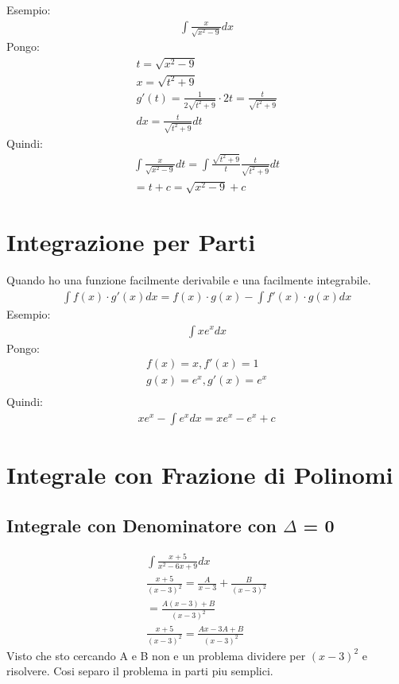\documentclass{article}
\begin{document}
Esempio:
\begin{gather*}
		\int \frac{x}{\sqrt{x^2 - 9}}dx
\end{gather*}
Pongo:
\begin{gather*}
		t=\sqrt{x^2 - 9}\\
		x = \sqrt{t^2 + 9}\\
		g'(t) = \frac{1}{2\sqrt{t^2 + 9}}\cdot 2t =\frac{t}{\sqrt{t^2+9}}\\
		dx=\frac{t}{\sqrt{t^2+9}}dt
\end{gather*}
Quindi:
\begin{gather*}
		\int \frac{x}{\sqrt{x^2-9}}dt=\int \frac{\sqrt{t^2+9}}{t}\frac{t}{\sqrt{t^2+9}}dt\\
		= t +c =\sqrt{x^2-9}+c
\end{gather*}
\section{Integrazione per Parti}
Quando ho una funzione facilmente derivabile e una facilmente integrabile.
\begin{gather*}
		\int f(x)\cdot g'(x)dx = f(x)\cdot g(x) - \int f'(x)\cdot g(x)dx
\end{gather*}
Esempio:
\begin{gather*}
		\int xe^x dx		
\end{gather*}
Pongo:
\begin{gather*}
		f(x) = x, f'(x) = 1\\
		g(x) = e^x, g'(x) = e^x\\
\end{gather*}
Quindi:
\begin{gather*}
		xe^x - \int e^x dx = xe^x - e^x + c
\end{gather*}
\section{Integrale con Frazione di Polinomi}

\subsection{Integrale con Denominatore con $\Delta$ = 0}

\begin{gather*}
		\int \frac{x + 5}{x^2-6x+9}dx\\
		\frac{x+5}{(x-3)^2} = \frac{A}{x-3}+\frac{B}{(x-3)^2}\\
	=\frac{A(x-3)+B}{(x-3)^2}\\
	\frac{x+5}{(x-3)^2}=\frac{Ax-3A+B}{(x-3)^2}
\end{gather*}
Visto che sto cercando A e B non e un problema dividere per  $(x-3)^2$ e risolvere. Cosi separo il problema in parti piu semplici.
\end{document}
